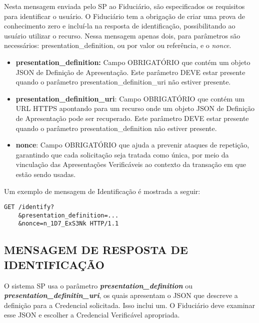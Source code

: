 Nesta mensagem enviada pelo \acs{SP} ao Fiduciário, são especificados os requisitos para identificar o usuário. O Fiduciário tem a obrigação de criar uma prova de conhecimento zero e incluí-la na resposta de identificação, possibilitando ao usuário utilizar o recurso. Nessa mensagem apenas dois, para parâmetros são necessários: presentation\_definition, ou por valor ou referência, e o \textit{nonce}.

\begin{itemize}
    \item \textbf{presentation\_definition:} Campo OBRIGATÓRIO que contém um objeto JSON de Definição de Apresentação. Este parâmetro DEVE estar presente quando o parâmetro presentation\_definition\_uri não estiver presente.


    \item \textbf{presentation\_definition\_uri}: Campo OBRIGATÓRIO que contém um URL HTTPS apontando para um recurso onde um objeto JSON de Definição de Apresentação pode ser recuperado. Este parâmetro DEVE estar presente quando o parâmetro presentation\_definition não estiver presente.

    \item \textbf{nonce}: Campo OBRIGATÓRIO que ajuda a prevenir ataques de repetição, garantindo que cada solicitação seja tratada como única, por meio da vinculação das Apresentações Verificáveis ao contexto da transação em que estão sendo usadas.
\end{itemize}


Um exemplo de mensagem de Identificação é mostrada a seguir:

\begin{lstlisting}[language=code, caption=Exemplo para a mensagem id-request, label=input-label]
    GET /identify?
    &presentation_definition=...
    &nonce=n_1D7_ExS3Nk HTTP/1.1
\end{lstlisting}


\subsection{MENSAGEM DE RESPOSTA DE IDENTIFICAÇÃO}

O sistema SP usa o parâmetro \textbf{\textit{presentation\_definition}} ou \textit{\textbf{presentation\_definitin\_uri}}, os quais apresentam o JSON que descreve a definição para a Credencial solicitada. Isso inclui um. O Fiduciário deve examinar esse JSON e escolher a Credencial Verificável apropriada.

